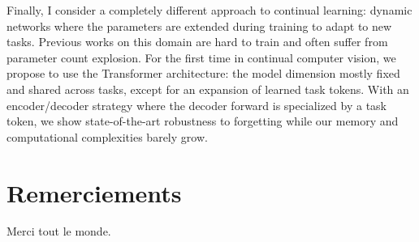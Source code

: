 \begin{itemize}
          Finally, I consider a completely different approach to continual learning: dynamic networks
          where the parameters are extended during training to adapt to new tasks. Previous works on
          this domain are hard to train and often suffer from parameter count explosion. For the
          first time in continual computer vision, we propose to use the Transformer architecture:
          the model dimension mostly fixed and shared across tasks, except for an
          expansion of learned task tokens. With an encoder/decoder strategy where the decoder
          forward is specialized by a task token, we show state-of-the-art robustness to forgetting
          while our memory and computational complexities barely grow.
\end{itemize}

\cleardoublepage
\chapter{Remerciements}


Merci tout le monde.


